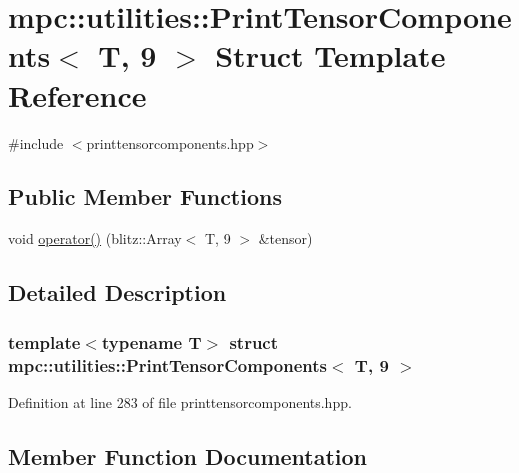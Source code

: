 \hypertarget{structmpc_1_1utilities_1_1_print_tensor_components_3_01_t_00_019_01_4}{}\section{mpc\+:\+:utilities\+:\+:Print\+Tensor\+Components$<$ T, 9 $>$ Struct Template Reference}
\label{structmpc_1_1utilities_1_1_print_tensor_components_3_01_t_00_019_01_4}


{\ttfamily \#include $<$printtensorcomponents.\+hpp$>$}

\subsection*{Public Member Functions}
\begin{DoxyCompactItemize}
\item 
void \mbox{\hyperlink{structmpc_1_1utilities_1_1_print_tensor_components_3_01_t_00_019_01_4_af6466d6b11a9cb63e1ecc7911830b644}{operator()}} (blitz\+::\+Array$<$ T, 9 $>$ \&tensor)
\end{DoxyCompactItemize}


\subsection{Detailed Description}
\subsubsection*{template$<$typename T$>$\newline
struct mpc\+::utilities\+::\+Print\+Tensor\+Components$<$ T, 9 $>$}



Definition at line 283 of file printtensorcomponents.\+hpp.



\subsection{Member Function Documentation}
\mbox{\label{structmpc_1_1utilities_1_1_print_tensor_components_3_01_t_00_019_01_4_af6466d6b11a9cb63e1ecc7911830b644}} 

